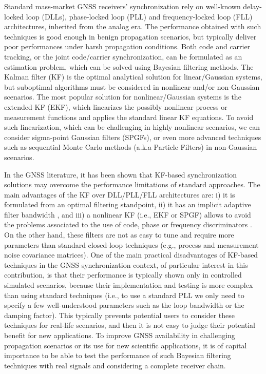 Standard mass-market GNSS receivers' synchronization rely on well-known delay-locked loop (DLLs), phase-locked loop (PLL) and frequency-locked loop (FLL) architectures, inherited from the analog era. The performance obtained with such techniques is good enough in benign propagation scenarios, but typically deliver poor performances under harsh propagation conditions. Both code and carrier tracking, or the joint code/carrier synchronization, can be formulated as an estimation problem, which can be solved using Bayesian filtering methods. The Kalman filter (KF) is the optimal analytical solution for linear/Gaussian systems, but suboptimal algorithms must be considered in nonlinear and/or non-Gaussian scenarios. The most popular solution for nonlinear/Gaussian systems is the extended KF (EKF), which linearizes the possibly nonlinear process or measurement functions and applies the standard linear KF equations. To avoid such linearization, which can be challenging in highly nonlinear scenarios, we can consider sigma-point Gaussian filters (SPGFs), or even more advanced techniques such as sequential Monte Carlo methods (a.k.a Particle Filters) in non-Gaussian scenarios. 

In the GNSS literature, it has been shown that KF-based synchronization solutions \cite{Vila17c} may overcome the performance limitations of standard approaches. The main advantages of the KF over DLL/PLL/FLL architectures are: i) it is formulated from an optimal filtering standpoint, ii) it has an implicit adaptive filter bandwidth \cite{Vila-14a}, and iii) a nonlinear KF (i.e., EKF or SPGF) allows to avoid the problems associated to the use of code, phase or frequency discriminators \cite{Vila-14b}. On the other hand, these filters are not as easy to tune and require more parameters than standard closed-loop techniques (e.g., process and measurement noise covariance matrices). One of the main practical disadvantages of KF-based techniques in the GNSS synchronization context, of particular interest in this contribution, is that their performance is typically shown only in controlled simulated scenarios, because their implementation and testing is more complex than using standard techniques (i.e., to use a standard PLL we only need to specify a few well-understood parameters such as the loop bandwidth or the damping factor). This typically prevents potential users to consider these techniques for real-life scenarios, and then it is not easy to judge their potential benefit for new applications. To improve GNSS availability in challenging propagation scenarios or its use for new scientific applications, it is of capital importance to be able to test the performance of such Bayesian filtering techniques with real signals and considering a complete receiver chain.



